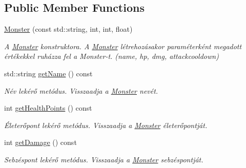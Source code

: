 \subsection*{Public Member Functions}
\begin{DoxyCompactItemize}
\item 
\mbox{\label{classMonster_abc26caf327967646c0b9fce3b231c410}} 
\hyperlink{classMonster_abc26caf327967646c0b9fce3b231c410}{Monster} (const std\+::string, int, int, float)
\begin{DoxyCompactList}\small\item\em A \hyperlink{classMonster}{Monster} konstruktora. A \hyperlink{classMonster}{Monster} létrehozásakor paraméterként megadott értékekkel ruházza fel a Monster-\/t. (name, hp, dmg, attackcooldown) \end{DoxyCompactList}\item 
\mbox{\label{classMonster_a28ae1112e37262ce150e3c02465b3dd5}} 
std\+::string \hyperlink{classMonster_a28ae1112e37262ce150e3c02465b3dd5}{get\+Name} () const
\begin{DoxyCompactList}\small\item\em Név lekérő metódus. Visszaadja a \hyperlink{classMonster}{Monster} nevét. \end{DoxyCompactList}\item 
\mbox{\label{classMonster_acbfb552014439fe02d10f2492e60fe34}} 
int \hyperlink{classMonster_acbfb552014439fe02d10f2492e60fe34}{get\+Health\+Points} () const
\begin{DoxyCompactList}\small\item\em Életerőpont lekérő metódus. Visszaadja a \hyperlink{classMonster}{Monster} életerőpontját. \end{DoxyCompactList}\item 
\mbox{\label{classMonster_a5872e19f684e0a81ead15da3e82992ad}} 
int \hyperlink{classMonster_a5872e19f684e0a81ead15da3e82992ad}{get\+Damage} () const
\begin{DoxyCompactList}\small\item\em Sebzéspont lekérő metódus. Visszaadja a \hyperlink{classMonster}{Monster} sebzéspontját. \end{DoxyCompactList}\item 
\mbox{\label{classMonster_abcb5bbbf0cd0ff5c599438511a63a6ae}} 

\end{DoxyCompactItemize}
